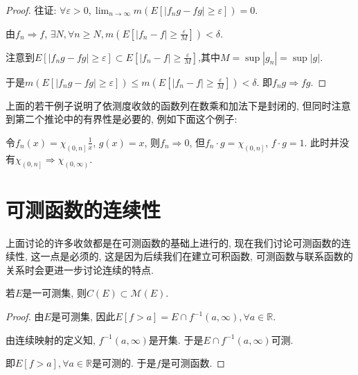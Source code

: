 \documentclass[theorem=false,mathfont=none,openany,sub3section]{easybook}
\begin{document}
\begin{proof}
  往证: $\forall \varepsilon >0, \lim_{n \to \infty}m\left(E\left[|f_ng-fg|\geqslant \varepsilon\right]\right) = 0$.\par
  由$f_n\Rightarrow f$, $\exists N, \forall n\geqslant N, m(E\left[|f_n-f|\geqslant \frac{\varepsilon}{M}\right])<\delta$.\par
  注意到$E\left[|f_ng-fg|\geqslant \varepsilon\right]\subset  E\left[|f_n-f|\geqslant \frac{\varepsilon}{M}\right]$,其中$M=\sup |g_n|=\sup |g|$.\par
  于是$m\left(E\left[|f_ng-fg|\geqslant \varepsilon\right]\right)\leqslant m\left(E\left[|f_n-f|\geqslant \frac{\varepsilon}{M}\right]\right)<\delta$. 即$f_ng\Rightarrow fg$.\par
\end{proof}

\begin{remark}
  上面的若干例子说明了依测度收敛的函数列在数乘和加法下是封闭的, 但同时注意到第二个推论中的有界性是必要的, 例如下面这个例子:\par
  令$f_n(x)=\chi_{\left(\right.0,n\left.\right]} \frac{1}{x}$, $g(x)=x$, 则$f_n\Rightarrow 0$, 但$f_n\cdot g = \chi_{\left(\right.0,n\left.\right]}$, $f\cdot g = 1$. 此时并没有$\chi_{\left(\right.0,n\left.\right]}\Rightarrow \chi_{\left(0,\infty\right)}$.\par
\end{remark}

\newpage

\section{可测函数的连续性}

上面讨论的许多收敛都是在可测函数的基础上进行的, 现在我们讨论可测函数的连续性, 这一点是必须的, 这是因为后续我们在建立可积函数, 可测函数与联系函数的关系时会更进一步讨论连续的特点. \par

\begin{lemma}
  若$E$是一可测集, 则$C(E)\subset \mathcal{M} (E)$.
\end{lemma}

\begin{proof}
  由$E$是可测集, 因此$E[f>a]=E\cap f^{-1}\left(a,\infty\right), \forall a \in \mathbb{R}$. \par
  由连续映射的定义知, $f^{-1}\left(a,\infty\right)$是开集. 于是$E\cap f^{-1}\left(a,\infty\right)$可测.\par
  即$E[f>a],\forall a \in \mathbb{R}$是可测的. 于是$f$是可测函数.\par
\end{proof}
\end{document}

